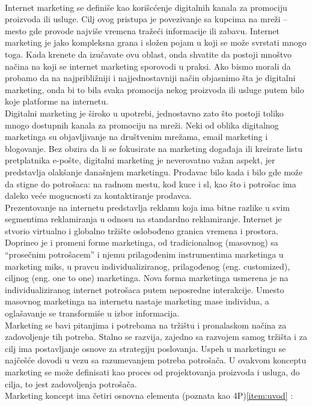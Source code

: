 \documentclass[a4paper]{article}
\begin{document}
{\\Internet marketing se definiše kao korišcćenje digitalnih kanala za promociju proizvoda ili usluge. Cilj ovog pristupa je povezivanje sa kupcima na mreži – mesto gde provode najviše vremena tražeći informacije ili zabavu. Internet marketing je jako kompleksna grana i složen pojam u koji se može svrstati mnogo toga. Kada krenete da izučavate ovu oblast, onda shvatite da postoji mnoštvo načina na koji se internet marketing sporovodi u praksi. Ako bismo morali da probamo da na najpribližniji i najjednostavniji način objasnimo šta je digitalni marketing, onda bi to bila svaka promocija nekog proizvoda ili usluge putem bilo koje platforme na internetu.
\\ Digitalni marketing je široko u upotrebi, jednostavno zato što postoji toliko mnogo dostupnih kanala za promociju na mreži. Neki od oblika digitalnog marketinga su objavljivanje na društvenim mrežama, email marketing i blogovanje. Bez obzira da li se fokusirate na marketing događaja ili kreirate listu pretplatnika e-pošte, digitalni marketing je neverovatno važan aspekt, jer predstavlja olakšanje današnjem marketingu. Prodavac bilo kada i bilo gde može da stigne do potrošaca: na radnom mestu, kod kuce i sl, kao što i potrošac ima daleko veće mogucnosti za kontaktiranje prodavca.
\\ Prezentovanje na internetu predstavlja reklamu koja ima bitne razlike u svim segmentima reklamiranja u odnosu na standardno reklamiranje.
Internet je stvorio virtualno i globalno tržište oslobođeno granica vremena i prostora. Doprineo je i promeni forme marketinga, od tradicionalnog (masovnog) sa “prosečnim potrošacem” i njemu prilagođenim instrumentima marketinga u marketing miks, u pravcu individualiziranog, prilagođenog (eng. customized), ciljnog (eng. one to one) marketinga. Nova forma marketinga usmerena je na individualiziranog internet potrošaca putem neposredne interakcije. Umesto masovnog marketinga na internetu nastaje marketing mase individua, a oglašavanje se transformiše u izbor informacija.
\\ Marketing se bavi pitanjima i potrebama na tržištu i pronalaskom načina za zadovoljenje tih potreba. Stalno se razvija, zajedno sa razvojem samog tržišta i za cilj ima postavljanje osnove za strategiju poslovanja. Uspeh u marketingu se najčešće dovodi u vezu sa razumevanjem potreba potrošača. U ovakvom konceptu marketing se može definisati kao proces od projektovanja proizvoda i usluga, do cilja, to jest zadovoljenja potrošača.
\\Marketing koncept ima četiri osnovna elementa (poznata kao 4P)\ref{item:uvod} :
}
\end{document}
